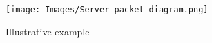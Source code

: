 \documentclass[journal]{IEEEtran}
\begin{document}
\begin{figure}[t]
\centering
\texttt{[image: Images/Server packet diagram.png]}
\caption{Illustrative example}
\label{Fig 0}
\vspace{0.4cm}
\end{figure}
\end{document}
